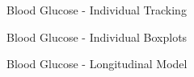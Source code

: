 \documentclass[dvips, 10pt]{article}
\begin{document}
\begin{figure}
\caption{Blood Glucose - Individual Tracking}
\end{figure}
\clearpage

\begin{figure}
\caption{Blood Glucose - Individual Boxplots}
\end{figure}
\clearpage

\begin{figure}
\caption{Blood Glucose - Longitudinal Model}
\end{figure}
\clearpage
\end{document}
